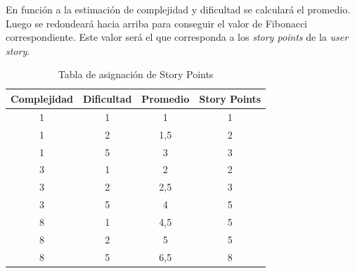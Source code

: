 \documentclass[
11pt, %
]{charter}
\begin{document}
En función a la estimación de complejidad y dificultad se calculará el promedio. Luego se redondeará hacia arriba para conseguir el valor de Fibonacci correspondiente. Este valor será el que corresponda a los \textit{story points} de la \textit{user story}.

\begin{table}[ht]
\centering
\caption{Tabla de asignación de Story Points}
\label{tab:story-points}
\begin{tabular}{|c|c|c|c|}
\hline
\textbf{Complejidad} & \textbf{Dificultad} & \textbf{Promedio} & \textbf{Story Points} \\ \hline
1                    & 1                   & 1                     & 1                 \\ \hline
1                    & 2                   & 1,5                   & 2                 \\ \hline
1                    & 5                   & 3                     & 3                 \\ \hline
3                    & 1                   & 2                     & 2                 \\ \hline
3                    & 2                   & 2,5                   & 3                 \\ \hline
3                    & 5                   & 4                     & 5                 \\ \hline
8                    & 1                   & 4,5                   & 5                 \\ \hline
8                    & 2                   & 5                     & 5                 \\ \hline
8                    & 5                   & 6,5                   & 8                 \\ \hline
\end{tabular}
\end{table}
\end{document}
